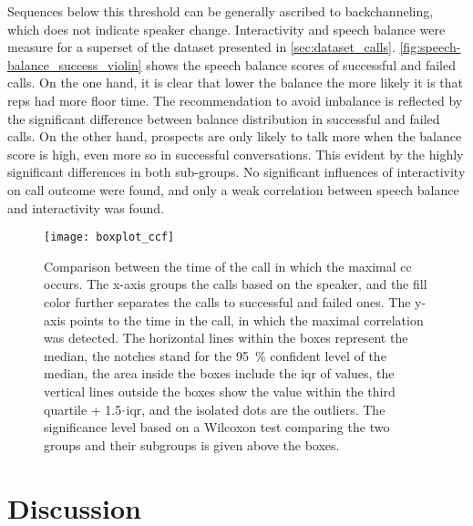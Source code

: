 Sequences below this threshold can be generally ascribed to backchanneling, which does not indicate speaker change.
Interactivity and speech balance were measure for a superset of the dataset presented in \cref{sec:dataset_calls}.
\cref{fig:speech-balance_success_violin} shows the speech balance scores of successful and failed calls.
On the one hand, it is clear that lower the balance the more likely it is that reps had more floor time.
The recommendation to avoid imbalance is reflected by the significant difference between balance distribution in successful and failed calls.
On the other hand, prospects are only likely to talk more when the balance score is high, even more so in successful conversations.
This evident by the highly significant differences in both sub-groups.
No significant influences of interactivity on call outcome were found, and only a weak correlation between speech balance and interactivity was found. %
%
\begin{figure}[H]
	\centering
	\texttt{[image: boxplot\_ccf]}
	\caption[Comparison between sales reps' and prospects' maximal \acl{cc} point in conversation for successful and failed calls.]
		{Comparison between the time of the call in which the maximal \acl{cc} occurs.
		The x-axis groups the calls based on the speaker, and the fill color further separates the calls to successful and failed ones.
		The y-axis points to the time in the call, in which the maximal correlation was detected.
		The horizontal lines within the boxes represent the median,
		the notches stand for the \SI{95}{\percent} confident level of the median, the area inside the boxes include the \acf{iqr} of values, the vertical lines outside the boxes show the value within the third quartile + 1.5$\protect\cdot$\ac{iqr}, and the isolated dots are the outliers.
		The significance level based on a Wilcoxon test comparing the two groups and their subgroups is given above the boxes.}
	\label{fig:barplot_conv_leaders}
\end{figure}
%

\section{Discussion}
\label{sec:discussion_hhi}

